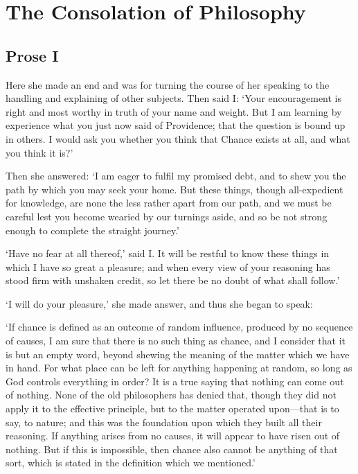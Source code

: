 
\author{Boethius}
\chapter[The Consolation of Philosophy, bk. 5]{The Consolation of
Philosophy}

\section*{Prose I}

Here she made an end and was for turning the course of her speaking to
the handling and explaining of other subjects. Then said I: `Your
encouragement is right and most worthy in truth of your name and
weight. But I am learning by experience what you just now said of
Providence; that the question is bound up in others. I would ask you
whether you think that Chance exists at all, and what you think it
is?'

Then she answered: `I am eager to fulfil my promised debt, and to shew
you the path by which you may seek your home. But these things, though
all-expedient for knowledge, are none the less rather apart from our
path, and we must be careful lest you become wearied by our turnings
aside, and so be not strong enough to complete the straight journey.'

`Have no fear at all thereof,' said I. It will be restful to know
these things in which I have so great a pleasure; and when every view
of your reasoning has stood firm with unshaken credit, so let there be
no doubt of what shall follow.'

`I will do your pleasure,' she made answer, and thus she began to
speak:

`If chance is defined as an outcome of random influence,
produced by no sequence of causes, I am sure that there is no such
thing as chance, and I consider that it is but an empty word, beyond
shewing the meaning of the matter which we have in hand. For what
place can be left for anything happening at random, so long as God
controls everything in order? It is a true saying that nothing can
come out of nothing. None of the old philosophers has denied that,
though they did not apply it to the effective principle, but to the
matter operated upon---that is to say, to nature; and this was the
foundation upon which they built all their reasoning. If anything
arises from no causes, it will appear to have risen out of nothing.
But if this is impossible, then chance also cannot be anything of
that sort, which is stated in the definition which we mentioned.'


